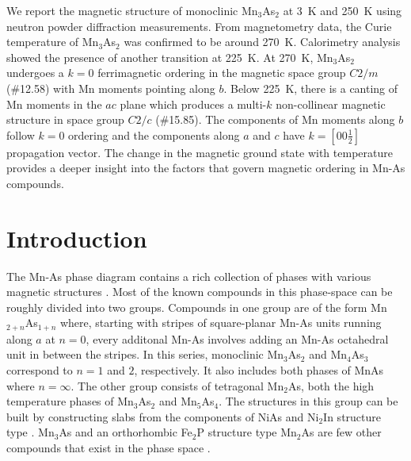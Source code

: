 \documentclass[10pt,doublespacing,edeposit]{uiucthesis2020}
\begin{document}
\begin{mainmatter}
We report the magnetic structure of monoclinic Mn$_3$As$_2$ at 3~K and 250~K using neutron powder diffraction measurements. From magnetometry data, the Curie temperature of Mn$_3$As$_2$ was confirmed to be around 270~K. Calorimetry analysis showed the presence of another transition at 225~K. At 270~K, Mn$_3$As$_2$ undergoes a $k = 0$ ferrimagnetic ordering in the magnetic space group $C2/m$ (\#12.58) with Mn moments pointing along $b$. Below 225~K, there is a canting of Mn moments in the $ac$ plane which produces a multi-$k$  non-collinear magnetic structure in space group $C2/c$ (\#15.85). The components of Mn moments along $b$ follow $k=0$ ordering and the components along $a$ and $c$ have $k = [0 0 \frac{1}{2}]$ propagation vector. The change in the magnetic ground state with temperature provides a deeper insight into the factors that govern magnetic ordering in Mn-As compounds.





\section{Introduction} 



The Mn-As phase diagram contains a rich collection of phases with various magnetic structures \cite{Bacon1955,Yuzuri1960,Carrillo-Cabrera1983,Dietrich1990,Moller1993,Hagedorn1994,Hagedorn1995}. Most of the known compounds in this phase-space can be roughly divided into two groups. Compounds in one group are of the form Mn$_{2+n}$As$_{1+n}$ where, starting with stripes of square-planar Mn-As units running along $a$ at $n=0$, every additonal Mn-As involves adding an Mn-As octahedral unit in between the stripes.
In this series, monoclinic Mn$_3$As$_2$ and Mn$_4$As$_3$ correspond to $n=1$ and $2$, respectively. 
It also includes both phases of MnAs where $n=\infty$. The other group consists of tetragonal Mn$_2$As, both the high temperature phases of Mn$_3$As$_2$ and Mn$_5$As$_4$. The structures in this group can be built by constructing slabs from the components of NiAs and Ni$_2$In structure type \cite{Hagedorn1995}. Mn$_3$As and an orthorhombic Fe$_2$P structure type Mn$_2$As are few other compounds that exist in the phase space \cite{Jeitschko1972,Carrillo-Cabrera1983}.


\end{mainmatter}
\end{document}

